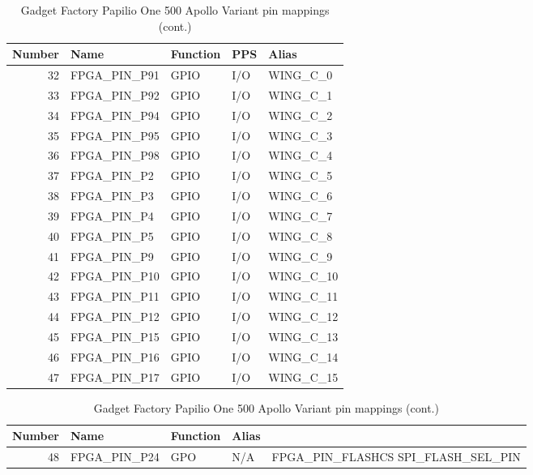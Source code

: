 \documentclass[12pt,a4paper,openany,smallheadings,headinclude,headsepline,final]{scrreprt}
\def \board {Gadget Factory Papilio One 500 Apollo Variant }
\begin{document}
\begin{table}[H]
\begin{center}
\begin{tabularx}{14cm}{rlllX}
Number & Name & Function & PPS & Alias \\
\hline
32 & FPGA\_PIN\_P91 & GPIO & I/O & WING\_C\_0 \\
33 & FPGA\_PIN\_P92 & GPIO & I/O & WING\_C\_1 \\
34 & FPGA\_PIN\_P94 & GPIO & I/O &  WING\_C\_2 \\
35 & FPGA\_PIN\_P95 & GPIO & I/O & WING\_C\_3 \\
36 & FPGA\_PIN\_P98 & GPIO & I/O & WING\_C\_4 \\
37 & FPGA\_PIN\_P2  & GPIO & I/O & WING\_C\_5 \\
38 & FPGA\_PIN\_P3  & GPIO & I/O & WING\_C\_6 \\
39 & FPGA\_PIN\_P4  & GPIO & I/O & WING\_C\_7 \\
40 & FPGA\_PIN\_P5  & GPIO & I/O & WING\_C\_8 \\
41 & FPGA\_PIN\_P9  & GPIO & I/O & WING\_C\_9 \\
42 & FPGA\_PIN\_P10 & GPIO & I/O & WING\_C\_10 \\
43 & FPGA\_PIN\_P11 & GPIO & I/O & WING\_C\_11 \\
44 & FPGA\_PIN\_P12 & GPIO & I/O & WING\_C\_12 \\
45 & FPGA\_PIN\_P15 & GPIO & I/O & WING\_C\_13 \\
46 & FPGA\_PIN\_P16 & GPIO & I/O & WING\_C\_14 \\
47 & FPGA\_PIN\_P17 & GPIO & I/O & WING\_C\_15 
\end{tabularx}
\caption{\board pin mappings (cont.)}
\end{center}
\end{table}


\begin{table}[H]
\begin{center}
\begin{tabularx}{14cm}{rlllX}
Number & Name & Function & Alias \\
\hline
48 & FPGA\_PIN\_P24 & GPO & N/A &  FPGA\_PIN\_FLASHCS SPI\_FLASH\_SEL\_PIN 
\end{tabularx}
\caption{\board pin mappings (cont.)}
\end{center}
\end{table}

%
%
\end{document}
